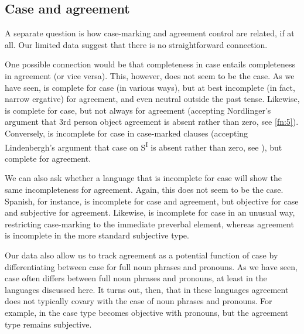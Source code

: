 \documentclass[output=paper]{langsci/langscibook}
\begin{document}
\subsection{Case and agreement}\label{sec:key:11.5.4}

A separate question is how case-marking and agreement control are related, if
at all. Our limited data suggest that there is no straightforward connection.

One possible connection would be that completeness in case entails completeness
in agreement (or vice versa). This, however, does not seem to be the case. As
we have seen,  is complete for case (in various ways), but
at best incomplete (in fact, narrow ergative) for agreement, and even neutral
outside the past tense. Likewise,  is complete for case, but not
always for agreement (accepting Nordlinger’s argument that 3rd person object
agreement is absent rather than zero, see \cref{fn:5}). Conversely,  is incomplete for case in case-marked clauses (accepting Lindenbergh’s
argument that case on S\textsuperscript{I} is absent rather than zero, see
), but complete for agreement.

We can also ask whether a language that is incomplete for case will show the
same incompleteness for agreement. Again, this does not seem to be the case.
Spanish, for instance, is incomplete for case and agreement, but objective for
case and subjective for agreement. Likewise,  is incomplete for
case in an unusual way, restricting case-marking to the immediate preverbal
element, whereas agreement is incomplete in the more standard subjective
 type.

Our data also allow us to track agreement  as a potential
function of case  by differentiating between case for full noun
phrases and pronouns. As we have seen, case  often differs
between full noun phrases and pronouns, at least in the languages discussed
here. It turns out, then, that in these languages agreement 
does not typically covary with the case  of noun phrases and
pronouns. For example, in  the case  type becomes
objective with pronouns, but the agreement  type remains subjective.
\end{document}
